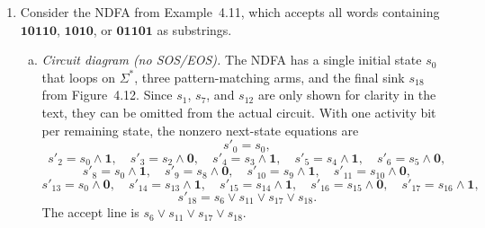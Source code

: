 \begin{enumerate}[{4.}1.]
\begin{enumerate}[(a)]
  \item \emph{DFA $T^d$ (connected portion).}  See Exercise~4.29 for the
  subset construction.  The connected DFA is exactly the 12-state machine
  listed there, with states $Q_0,\dots,Q_{11}$ and the transition table given
  in Exercise~4.29.
\end{enumerate}

\item Consider the NDFA from Example~4.11, which accepts all words containing
$\pmb{10110}$, $\pmb{1010}$, or $\pmb{01101}$ as substrings.

\begin{enumerate}[(a)]
  \item \emph{Circuit diagram (no SOS/EOS).}  The NDFA has a single initial
  state $s_0$ that loops on $\Sigma^*$, three pattern-matching arms, and the
  final sink $s_{18}$ from Figure~4.12.  Since $s_1$, $s_7$, and $s_{12}$ are
  only shown for clarity in the text, they can be omitted from the actual
  circuit.  With one activity bit per remaining state, the nonzero next-state
  equations are
  \[
    s'_0=s_0,
  \]
  \[
    s'_2=s_0\wedge \pmb{1},\quad
    s'_3=s_2\wedge \pmb{0},\quad
    s'_4=s_3\wedge \pmb{1},\quad
    s'_5=s_4\wedge \pmb{1},\quad
    s'_6=s_5\wedge \pmb{0},
  \]
  \[
    s'_8=s_0\wedge \pmb{1},\quad
    s'_9=s_8\wedge \pmb{0},\quad
    s'_{10}=s_9\wedge \pmb{1},\quad
    s'_{11}=s_{10}\wedge \pmb{0},
  \]
  \[
    s'_{13}=s_0\wedge \pmb{0},\quad
    s'_{14}=s_{13}\wedge \pmb{1},\quad
    s'_{15}=s_{14}\wedge \pmb{1},\quad
    s'_{16}=s_{15}\wedge \pmb{0},\quad
    s'_{17}=s_{16}\wedge \pmb{1},
  \]
  \[
    s'_{18}=s_6\vee s_{11}\vee s_{17}\vee s_{18}.
  \]
  The accept line is $s_6\vee s_{11}\vee s_{17}\vee s_{18}$.


\end{enumerate}
\end{enumerate}

